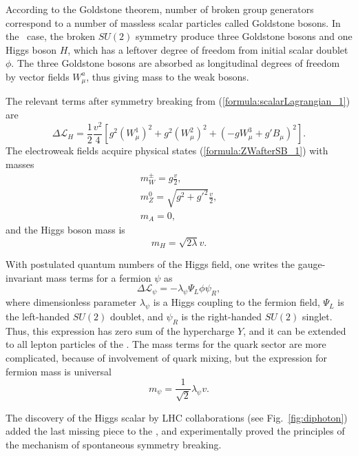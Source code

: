 According to the Goldstone theorem, number of broken group generators correspond to a number of massless scalar particles called Goldstone bosons. 
In the \sm\ case, the broken $SU(2)$ symmetry produce three Goldstone bosons and one Higgs boson $H$, which has a leftover degree of freedom from initial scalar doublet $\phi$.
The three Goldstone bosons are absorbed as longitudinal degrees of freedom by vector fields $W^a_\mu$, thus giving mass to the weak bosons.

The relevant terms after symmetry breaking from (\ref{formula:scalarLagrangian_1}) are
\begin{equation}
	\Delta \mathcal{L}_{H} = \frac{1}{2} \frac{v^2}{4}[g^2 (W^1_\mu)^2 + g^2 (W^2_\mu)^2 + (-g W^3_\mu + g' B_\mu)^2].
\end{equation}
The electroweak fields acquire physical states (\ref{formula:ZWafterSB_1}) with masses
\begin{equation}
\begin{array}{l}
m_W^\pm = g\frac{v}{2},\\
m_Z^0 = \sqrt{g^2 + g'^2}\frac{v}{2},\\
m_A = 0,
\end{array}
\label{formula:ZWmassafterSB_1}
\end{equation}
and the Higgs boson mass is
\begin{equation}
m_H = \sqrt{2\lambda}v.
\end{equation}

With postulated quantum numbers of the Higgs field, one writes the gauge-invariant mass terms for a fermion $\psi$ as 
\begin{equation}
	\Delta \mathcal{L}_\psi = -\lambda_\psi \Psi_L \phi \psi_R,
\end{equation}
where dimensionless parameter $\lambda_\psi$ is a Higgs coupling to the fermion field, $\Psi_L$ is the left-handed $SU(2)$ doublet, and $\psi_R$ is the right-handed $SU(2)$ singlet. Thus, this expression has zero sum of the hypercharge $Y$, and it can be extended to all lepton particles of the \sm. The mass terms for the quark sector are more complicated, because of involvement of quark mixing, but the expression for fermion mass is universal
\begin{equation}
	m_\psi = \frac{1}{\sqrt{2}} \lambda_\psi v.
    \label{formula:fermionMass_1}
\end{equation}

The discovery of the Higgs scalar by LHC collaborations (see Fig.~\ref{fig:diphoton}) added the last missing piece to the \sm, and experimentally proved the principles of the mechanism of spontaneous symmetry breaking.

